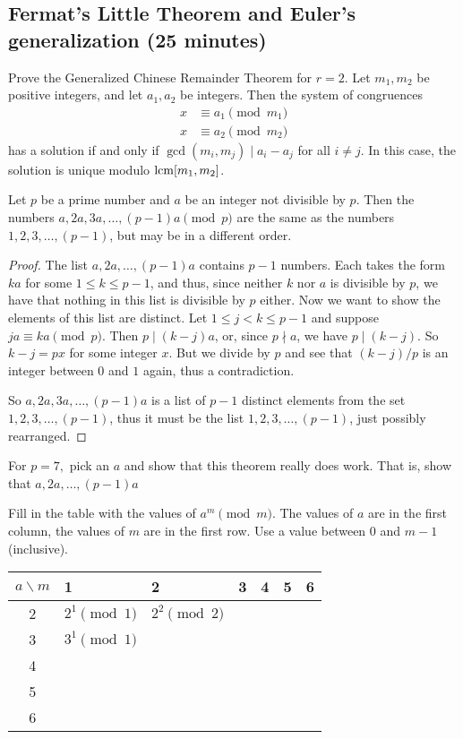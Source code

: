 \documentclass[letterpaper, 11 pt]{article}
\begin{document}
\subsection{Fermat's Little Theorem and Euler's generalization (25 minutes)}
\begin{br}[10 minutes]
 Prove the Generalized Chinese Remainder Theorem for $r=2$.
 	Let $m_1,m_2$ be positive integers, and let $a_1, a_2$ be integers. Then the system of congruences 
	\begin{align*}
 		x&\equiv a_1 \pmod{m_1}\\
 		x&\equiv a_2 \pmod{m_2}
	\end{align*}
	has a solution if and only if $\gcd(m_i,m_j)\mid a_i-a_j$ for all $i\neq j$. In this case, the solution is unique modulo $\operatorname{lcm}[m_1,m_2]$.
\end{br}
\begin{thm}Let $p$ be a prime number and $a$ be an integer not divisible by $p$. Then the numbers $a,2a,3a,\dots,(p-1)a \pmod{p}$ are the same as the numbers $1,2,3,\dots,(p-1)$, but may be in a different order. 
\end{thm}
\begin{proof} The list $a,2a,\dots, (p-1)a$ contains $p-1$ numbers. Each takes the form $ka$ for some $1\le k \le p-1$, and thus, since neither $k$ nor $a$ is divisible by $p$, we have that nothing in this list is divisible by $p$ either.  Now we want to show the elements of this list are distinct. Let $1\le j < k \le p-1$ and suppose $ja \equiv ka \pmod{p}$. Then $p\mid (k-j)a$, or, since $p\nmid a$, we have $p\mid (k-j)$. So $k-j = px$ for some integer $x$. But we divide by $p$ and see that $(k-j)/p$ is an integer between $0$ and $1$ again, thus a contradiction. 

So $a,2a,3a,\dots,(p-1)a$ is a list of $p-1$ distinct elements from the set $1,2,3,\dots,(p-1)$, thus it must be the list $1,2,3,\dots,(p-1)$, just possibly rearranged.
\end{proof}

\begin{br}[5 minutes] For $p=7,$ pick an $a$ and show that this theorem really does work. That is, show that  $a,2a,\dots, (p-1)a$ 
 
\end{br}

\begin{br}[5 minutes]
 Fill in the table with the values of $a^m \!\pmod m$. The values of $a$ are in the first column, the values of $m$ are in the first row. Use a value between $0$ and $m-1$ (inclusive).

\begin{tabular}{|c|p{3cm}|p{3cm}|p{1cm}|p{1cm}|p{1cm}|p{1cm}|}\hline
$a\backslash m$ & 1& 2& 3& 4&5&6 \\\hline
 2 &$2^1 \pmod 1$&$2^2 \pmod 2$&&&&\\\hline
 3 &$3^1\pmod 1$&&&&&\\\hline
 4 &&&&&&\\\hline
 5 &&&&&&\\\hline
 6 &&&&&&\\\hline
\end{tabular}
\end{br}
\end{document}
